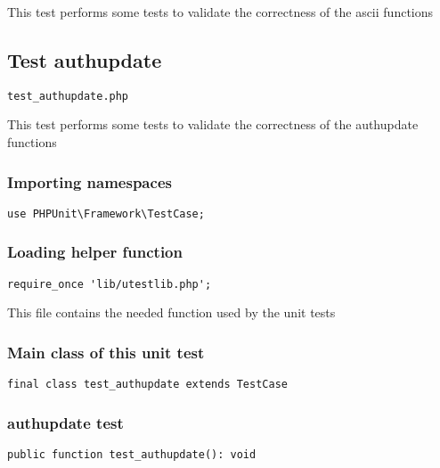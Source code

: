 \documentclass[a4paper]{article}
\begin{document}
This test performs some tests to validate the correctness
of the ascii functions

\hypertarget{toc46}{}
\subsection{Test authupdate}

\begin{lstlisting}
test_authupdate.php
\end{lstlisting}

This test performs some tests to validate the correctness
of the authupdate functions

\hypertarget{toc47}{}
\subsubsection{Importing namespaces}

\begin{lstlisting}
use PHPUnit\Framework\TestCase;
\end{lstlisting}

\hypertarget{toc48}{}
\subsubsection{Loading helper function}

\begin{lstlisting}
require_once 'lib/utestlib.php';
\end{lstlisting}

This file contains the needed function used by the unit tests

\hypertarget{toc49}{}
\subsubsection{Main class of this unit test}

\begin{lstlisting}
final class test_authupdate extends TestCase
\end{lstlisting}

\hypertarget{toc50}{}
\subsubsection{authupdate test}

\begin{lstlisting}
public function test_authupdate(): void
\end{lstlisting}
\end{document}
